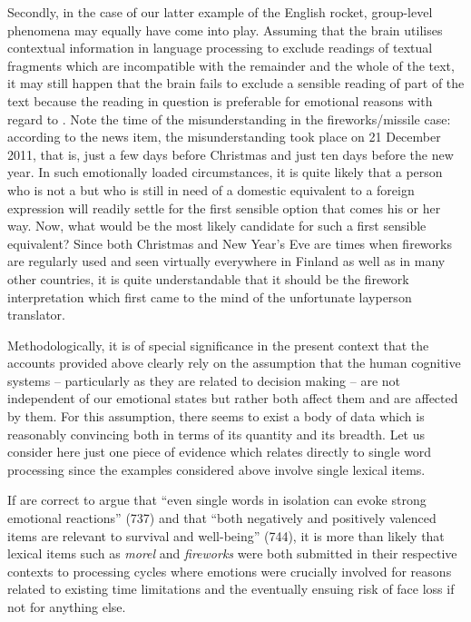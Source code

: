 \documentclass[output=paper]{LSP/langsci}
\begin{document}
Secondly, in the case of our latter example of the English rocket, group-level phenomena may equally have come into play. Assuming that the brain utilises contextual information in language processing to exclude readings of textual fragments which are incompatible with the remainder and the whole of the text, it may still happen that the brain fails to exclude a sensible reading of part of the text because the reading in question is preferable for emotional reasons with regard to . Note the time of the misunderstanding in the fireworks/missile case: according to the news item, the misunderstanding took place on 21 December 2011, that is, just a few days before Christmas and just ten days before the new year. In such emotionally loaded circumstances, it is quite likely that a person who is not a  but who is still in need of a domestic equivalent to a foreign expression will readily settle for the first sensible option that comes his or her way. Now, what would be the most likely candidate for such a first sensible equivalent? Since both Christmas and New Year's Eve are times when fireworks are regularly used and seen virtually everywhere in Finland as well as in many other countries, it is quite understandable that it should be the firework interpretation which first came to the mind of the unfortunate layperson translator.

Methodologically, it is of special significance in the present context that the accounts provided above clearly rely on the assumption that the human cognitive systems -- particularly as they are related to decision making -- are not independent of our emotional states but rather both affect them and are affected by them. For this assumption, there seems to exist a body of data which is reasonably convincing both in terms of its quantity and its breadth. Let us consider here just one piece of evidence which relates directly to single word processing since the examples considered above involve single lexical items.

If \citet{Vinson2014} are correct to argue that ``even single words in isolation can evoke strong emotional reactions'' (737) and that ``both negatively and positively valenced items are relevant to survival and well-being'' (744), it is more than likely that lexical items such as \textit{morel} and \textit{fireworks} were both submitted in their respective contexts to processing cycles where emotions were crucially involved for reasons related to existing time limitations and the eventually ensuing risk of face loss if not for anything else.
\end{document}
